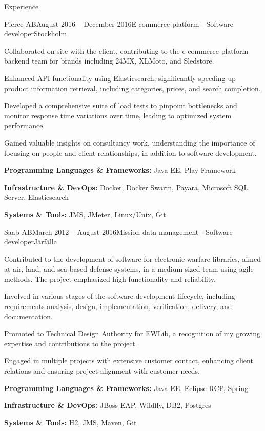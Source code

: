 \documentclass{resume}
\begin{document}
\begin{rSection}{Experience}
    \begin{rSubsection}{Pierce AB}{August 2016 -- December 2016}{E-commerce platform - Software developer}{Stockholm}
      \item Collaborated on-site with the client, contributing to the e-commerce platform backend team for brands including 24MX, XLMoto, and Sledstore.
      \item Enhanced API functionality using Elasticsearch, significantly speeding up product information retrieval, including categories, prices, and search completion.
      \item Developed a comprehensive suite of load tests to pinpoint bottlenecks and monitor response time variations over time, leading to optimized system performance.
      \item Gained valuable insights on consultancy work, understanding the importance of focusing on people and client relationships, in addition to software development.
      \item \textbf{Programming Languages \& Frameworks:} Java EE, Play Framework
      \item \textbf{Infrastructure \& DevOps:} Docker, Docker Swarm, Payara, Microsoft SQL Server, Elasticsearch
      \item \textbf{Systems \& Tools:} JMS, JMeter, Linux/Unix, Git
    \end{rSubsection}

    \begin{rSubsection}{Saab AB}{March 2012 -- August 2016}{Mission data management - Software developer}{Järfälla}
      \item Contributed to the development of software for electronic warfare libraries, aimed at air, land, and sea-based defense systems, in a medium-sized team using agile methods. The project emphasized high functionality and reliability.
      \item Involved in various stages of the software development lifecycle, including requirements analysis, design, implementation, verification, delivery, and documentation.
      \item Promoted to Technical Design Authority for EWLib, a recognition of my growing expertise and contributions to the project.
      \item Engaged in multiple projects with extensive customer contact, enhancing client relations and ensuring project alignment with customer needs.
      \item \textbf{Programming Languages \& Frameworks:} Java EE, Eclipse RCP, Spring
      \item \textbf{Infrastructure \& DevOps:} JBoss EAP, Wildfly, DB2, Postgres
      \item \textbf{Systems \& Tools:} H2, JMS, Maven, Git
    \end{rSubsection}


\end{rSection}
\end{document}
